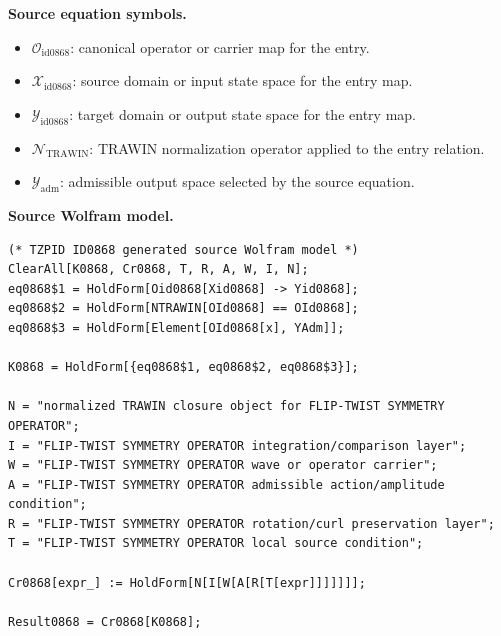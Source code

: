 \begin{minipage}[t]{0.49\linewidth}
\begingroup
\small
\raggedright
\textbf{Source equation symbols.}\par
\begin{itemize}[leftmargin=1.35em,itemsep=1pt,topsep=1pt,parsep=0pt]
    \item $\mathcal{O}_{\mathrm{id0868}}$: canonical operator or carrier map for the entry.
    \item $\mathcal{X}_{\mathrm{id0868}}$: source domain or input state space for the entry map.
    \item $\mathcal{Y}_{\mathrm{id0868}}$: target domain or output state space for the entry map.
    \item $\mathcal{N}_{\mathrm{TRAWIN}}$: TRAWIN normalization operator applied to the entry relation.
    \item $\mathcal{Y}_{\mathrm{adm}}$: admissible output space selected by the source equation.
\end{itemize}
\endgroup
\end{minipage}\hfill
\begin{minipage}[t]{0.47\linewidth}
\begingroup
\scriptsize
\raggedright
\textbf{Source Wolfram model.}\par
\begin{Verbatim}[fontsize=\tiny,breaklines=true,breakanywhere=true]
(* TZPID ID0868 generated source Wolfram model *)
ClearAll[K0868, Cr0868, T, R, A, W, I, N];
eq0868$1 = HoldForm[Oid0868[Xid0868] -> Yid0868];
eq0868$2 = HoldForm[NTRAWIN[OId0868] == OId0868];
eq0868$3 = HoldForm[Element[OId0868[x], YAdm]];

K0868 = HoldForm[{eq0868$1, eq0868$2, eq0868$3}];

N = "normalized TRAWIN closure object for FLIP-TWIST SYMMETRY OPERATOR";
I = "FLIP-TWIST SYMMETRY OPERATOR integration/comparison layer";
W = "FLIP-TWIST SYMMETRY OPERATOR wave or operator carrier";
A = "FLIP-TWIST SYMMETRY OPERATOR admissible action/amplitude condition";
R = "FLIP-TWIST SYMMETRY OPERATOR rotation/curl preservation layer";
T = "FLIP-TWIST SYMMETRY OPERATOR local source condition";

Cr0868[expr_] := HoldForm[N[I[W[A[R[T[expr]]]]]]];

Result0868 = Cr0868[K0868];
\end{Verbatim}
\endgroup
\end{minipage}

